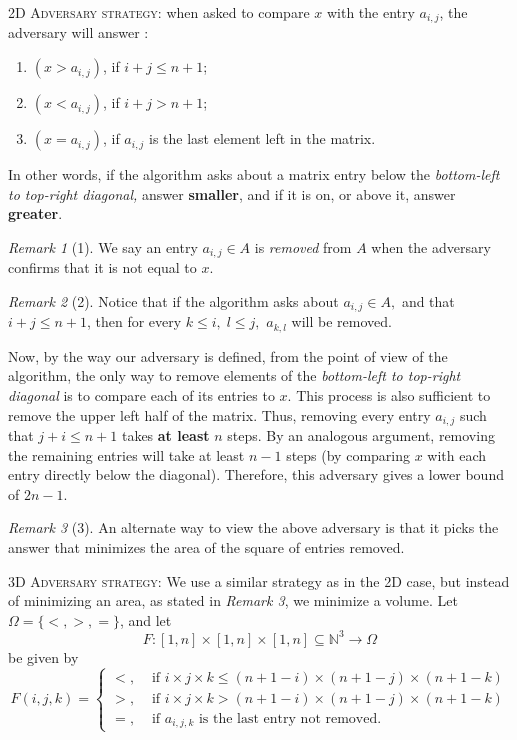 \documentclass[12pt]{article}
\theoremstyle{definition}
\theoremstyle{remark}
\newtheorem*{remark}{Remark}
\begin{document}
\begin{enumerate}
\begin{enumerate}
  \textsc{2D Adversary strategy:} when asked to compare $x$ with the entry $a_{i,j}$, the adversary will answer : 
  \begin{enumerate}
    \item $(x > a_{i,j})$, if $i + j \leq n + 1$; 
    \item $(x < a_{i,j})$, if $i+ j > n+ 1$; 
    \item $(x = a_{i,j})$, if $a_{i,j}$ is the last element left in the matrix. 
  \end{enumerate}
  In other words, if the algorithm asks about a matrix entry below the \textit{bottom-left to top-right diagonal,} answer \textbf{smaller}, and if it is on, or above it, answer \textbf{greater}. 
    \begin{remark}[1]
    We say an entry $a_{i,j} \in A$ is \textit{removed} from $A$ when the adversary confirms that it is not equal to $x$.   
  \end{remark}
  \begin{remark}[2]
    Notice that if the algorithm asks about $a_{i,j}\in A,$ and that $i + j \leq n + 1$, then for every $k\leq i, \; l \leq j,$ $a_{k,l}$ will be removed. 
  \end{remark}
  \hspace{24pt}Now, by the way our adversary is defined, from the point of view of the algorithm, the only way to remove elements of the \textit{bottom-left to top-right diagonal} is to compare each of its entries to $x$. This process is also sufficient to remove the upper left half of the matrix. Thus, removing every entry $a_{i,j}$ such that $j+ i \leq n+1$ takes \textbf{at least} $n$ steps. By an analogous argument, removing the remaining entries will take at least $n-1$ steps (by comparing $x$ with each entry directly below the diagonal). 
  Therefore, this adversary gives a lower bound of $2n -1.$
  \begin{remark}[3]
    An alternate way to view the above adversary is that it picks the answer that minimizes the area of the square of entries removed.
\end{remark}
  \textsc{3D Adversary strategy:} We use a similar strategy as in the 2D case, but instead of minimizing an area, as stated in \textit{Remark 3}, we minimize a volume. Let $\Omega = \{<, >, =\}$, and let 
  $$F: [1,n]\times [1, n]\times [1,n] \subseteq \mathbb{N}^3 \to \Omega $$
be given by 
  $$F(i,j,k) = 
  \begin{cases}
    <, &\text{ if } i \times j \times k \leq (n+1 - i )\times (n+1 - j ) \times (n+1 -k) \\ 
    >, &\text{ if } i \times j \times k > (n+1 - i )\times (n+1 - j ) \times (n+1 -k) \\ 
    =, &\text{ if } a_{i,j,k} \text{ is the last entry not removed. }
  \end{cases} $$
 

\end{enumerate}
\end{enumerate}
\end{document}
